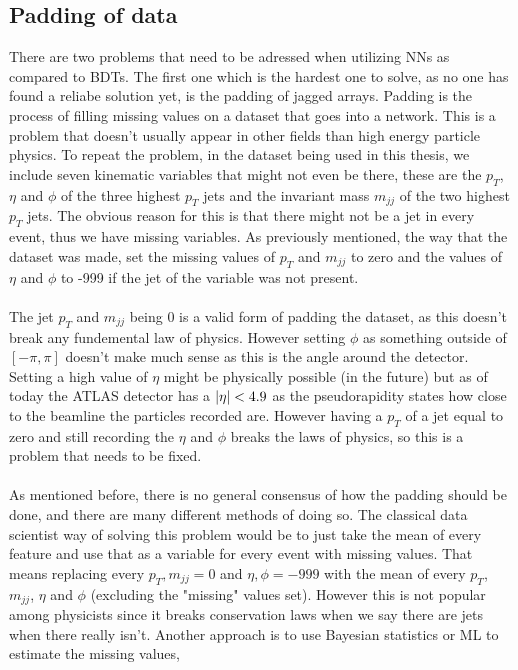 \documentclass[14pt, a4paper]{book}
\begin{document}
\subsection{Padding of data}\label{sec:padding_NN}
There are two problems that need to be adressed when utilizing NNs as compared to BDTs. The first one which is the hardest one to solve, as no one has found a reliabe solution yet, is the padding of jagged arrays.
Padding is the process of filling missing values on a dataset that goes into a network. This is a problem that doesn't usually appear in other fields than high energy particle physics.
To repeat the problem, in the dataset being used in this thesis, we include seven kinematic variables that might not even be there, these are the $p_T$, $\eta$ and $\phi$ of the three highest $p_T$ jets and the invariant mass $m_{jj}$ of the two highest $p_T$ jets. 
The obvious reason for this is that there might not be a jet in every event, thus we have missing variables. As previously mentioned, the way that the dataset was made, set the missing values of $p_T$ and $m_{jj}$ to zero and the values of $\eta$ and $\phi$ to -999 
if the jet of the variable was not present.\\
\\The jet $p_T$ and $m_{jj}$ being 0 is a valid form of padding the dataset, as this doesn't break any fundemental law of physics. However setting $\phi$ as something outside of $[-\pi,\pi]$ doesn't make much sense 
as this is the angle around the detector. Setting a high value of $\eta$ might be physically possible (in the future) but as of today the ATLAS detector has a $\abs{\eta}<4.9$ as the pseudorapidity 
states how close to the beamline the particles recorded are. However having a $p_T$ of a jet equal to zero and still recording the $\eta$ and $\phi$ breaks the laws of physics, so this is a problem that needs to be fixed.\\
\\As mentioned before, there is no general consensus of how the padding should be done, and there are many different methods of doing so. The classical data scientist way of solving this problem would be to just take 
the mean of every feature and use that as a variable for every event with missing values. That means replacing every $p_T, m_{jj} = 0$ and $\eta,\phi=-999$ with the mean of every $p_T$, $m_{jj}$, $\eta$ and $\phi$ (excluding the "missing" values set). 
However this is not popular among physicists since it breaks conservation laws when we say there are jets when there really isn't. Another approach is to use Bayesian statistics or ML to estimate the missing values, 
\end{document}
